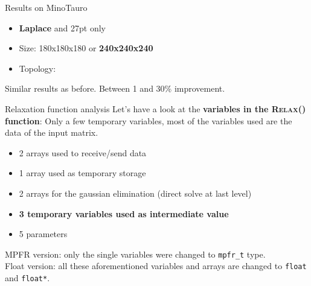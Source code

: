 \documentclass{beamer}
\begin{document}

\begin{frame}{Results on MinoTauro}
 \begin{itemize}
  \item \textbf{Laplace} and 27pt only
  \item Size: 180x180x180 or \textbf{240x240x240}
  \item Topology: 
 \end{itemize}
 Similar results as before. Between 1 and 30\% improvement.
\end{frame}

\begin{frame}{Relaxation function analysis}
  Let's have a look at the \textbf{variables in the \textsc{Relax}() function}:
  Only a few temporary variables, most of the variables used are the data of the input matrix.
  \begin{itemize}
    \item 2 arrays used to receive/send data
    \item 1 array used as temporary storage
    \item 2 arrays for the gaussian elimination (direct solve at last level)
    \item \textbf{3 temporary variables used as intermediate value}
    \item 5 parameters
   \end{itemize}
   MPFR version: only the single variables were changed to \texttt{mpfr\_t} type.\\
   Float version: all these aforementioned variables and arrays are changed to \texttt{float} and \texttt{float*}.
\end{frame}
\end{document}
